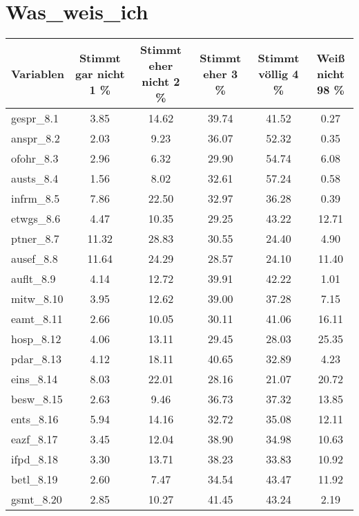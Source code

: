 \section{Was_weis_ich}
\begin{tabular}{lccccc}
\hline 
Variablen &
Stimmt gar nicht
1 
\% &
Stimmt eher nicht
2
\% &
Stimmt eher
3
\% &
Stimmt völlig
4
\% &
Weiß nicht
98
\%\\
\hline 
gespr_8.1&
3.85&
14.62&
39.74&
41.52&
0.27\\
anspr_8.2&
2.03&
9.23&
36.07&
52.32&
0.35\\
ofohr_8.3&
2.96&
6.32&
29.90&
54.74&
6.08\\
austs_8.4&
1.56&
8.02&
32.61&
57.24&
0.58\\
infrm_8.5&
7.86&
22.50&
32.97&
36.28&
0.39\\
etwgs_8.6&
4.47&
10.35&
29.25&
43.22&
12.71\\
ptner_8.7&
11.32&
28.83&
30.55&
24.40&
4.90\\
ausef_8.8&
11.64&
24.29&
28.57&
24.10&
11.40\\
auflt_8.9&
4.14&
12.72&
39.91&
42.22&
1.01\\
mitw_8.10&
3.95&
12.62&
39.00&
37.28&
7.15\\
eamt_8.11&
2.66&
10.05&
30.11&
41.06&
16.11\\
hosp_8.12&
4.06&
13.11&
29.45&
28.03&
25.35\\
pdar_8.13&
4.12&
18.11&
40.65&
32.89&
4.23\\
eins_8.14&
8.03&
22.01&
28.16&
21.07&
20.72\\
besw_8.15&
2.63&
9.46&
36.73&
37.32&
13.85\\
ents_8.16&
5.94&
14.16&
32.72&
35.08&
12.11\\
eazf_8.17&
3.45&
12.04&
38.90&
34.98&
10.63\\
ifpd_8.18&
3.30&
13.71&
38.23&
33.83&
10.92\\
betl_8.19&
2.60&
7.47&
34.54&
43.47&
11.92\\
gsmt_8.20&
2.85&
10.27&
41.45&
43.24&
2.19\\

\hline 
\end{tabular} 
